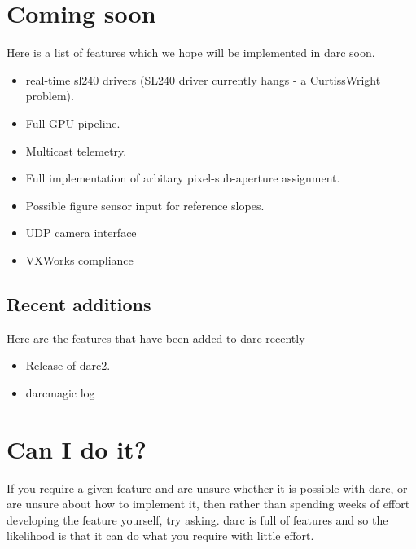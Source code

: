 \documentclass[a4,10pt]{article}
\begin{document}
\section{Coming soon}
Here is a list of features which we hope will be implemented in darc
soon.

\begin{itemize}
\item real-time sl240 drivers (SL240 driver currently hangs - a
  CurtissWright problem).
\item Full GPU pipeline.
\item Multicast telemetry.
\item Full implementation of arbitary pixel-sub-aperture assignment.
\item Possible figure sensor input for reference slopes.
\item UDP camera interface
\item VXWorks compliance
\end{itemize}

\subsection{Recent additions}
Here are the features that have been added to darc recently
\begin{itemize}
\item Release of darc2.
\item darcmagic log
\end{itemize}

\section{Can I do it?}
If you require a given feature and are unsure whether it is possible
with darc, or are unsure about how to implement it, then rather than
spending weeks of effort developing the feature yourself, try asking.
darc is full of features and so the likelihood is that it can do what
you require with little effort.
\end{document}
